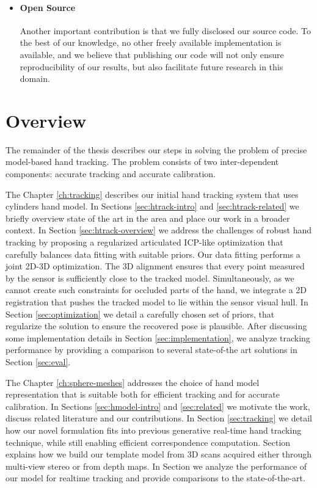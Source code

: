 \begin{itemize}
\item \paragraph{Open Source} Another important contribution is that we fully disclosed our source code. To the best of our knowledge, no other freely available implementation is available, and we believe that publishing our code will not only ensure reproducibility of our results, but also facilitate future research in this domain.

\end{itemize}

\section{Overview}

The remainder of the thesis describes our steps in solving the problem of precise model-based hand tracking. The problem consists of two inter-dependent components: accurate tracking and accurate calibration.

The Chapter \ref{ch:tracking} describes our initial hand tracking system that uses cylinders hand model. 
In Sections \ref{sec:htrack-intro} and \ref{sec:htrack-related} we briefly overview state of the art in the area and place our work in a broader context.
In Section  \ref{sec:htrack-overview} we address the challenges of robust hand tracking by proposing a regularized articulated ICP-like optimization that carefully balances data fitting with suitable priors. Our data fitting performs a joint 2D-3D optimization. The 3D alignment ensures that every point measured by the sensor is sufficiently close to the tracked model. Simultaneously, as we cannot create such constraints for occluded parts of the hand, we integrate a 2D registration that pushes the tracked model to lie within the sensor visual hull. In Section \ref{sec:optimization} we detail a carefully chosen set of priors, that regularize the solution to ensure the recovered pose is plausible. After discussing some implementation details in Section \ref{sec:implementation}, we analyze tracking performance by providing a comparison to several state-of-the art solutions in Section \ref{sec:eval}.

The Chapter \ref{ch:sphere-meshes} addresses the choice of hand model representation that is suitable both for efficient tracking and for accurate calibration.
In Sections \ref{sec:hmodel-intro} and \ref{sec:related} we motivate the work, discuss related literature and our contributions.
In Section \ref{sec:tracking} we detail how our novel formulation fits into previous generative real-time hand tracking technique, while still enabling efficient correspondence computation. Section \label{sec:modeling} explains how we build our template model from 3D scans acquired either through multi-view stereo or from depth maps. In Section \label{sec:results} we analyze the performance of our model for realtime tracking and provide comparisons to the state-of-the-art. 

